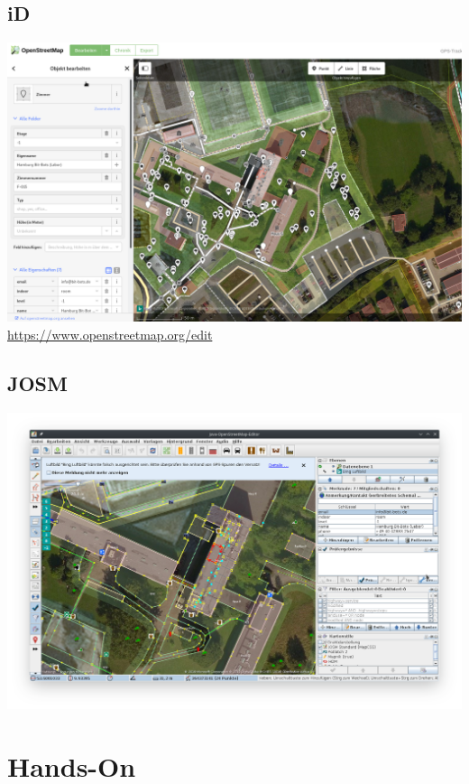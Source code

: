 \documentclass{beamer}
\begin{document}
	\subsection{iD}
	
	\begin{frame}
		\begin{center}
			\includegraphics[width=0.9\linewidth,height=0.9\textheight,keepaspectratio]{images/id-editor}
			\url{https://www.openstreetmap.org/edit}
		\end{center}
	\end{frame}
	
	\subsection{JOSM}
	
	\begin{frame}
		\begin{center}
			\includegraphics[width=\linewidth,height=\textheight,keepaspectratio]{images/josm-editor}
		\end{center}
	\end{frame}
	
	\section{Hands-On}
\end{document}

